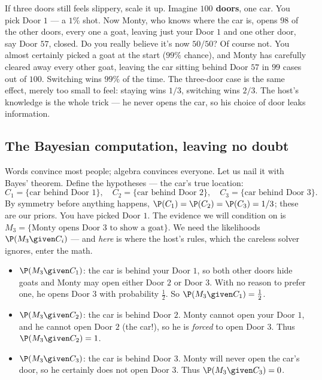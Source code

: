 \begin{intuitionbox}
If three doors still feels slippery, scale it up. Imagine \textbf{$100$ doors}, one car.
You pick Door $1$ --- a $1\%$ shot. Now Monty, who knows where the car is, opens
$98$ of the other doors, every one a goat, leaving just your Door $1$ and one other door,
say Door $57$, closed. Do you really believe it's now $50/50$? Of course not. You almost
certainly picked a goat at the start ($99\%$ chance), and Monty has carefully cleared away
every other goat, leaving the car sitting behind Door $57$ in $99$ cases out of $100$.
Switching wins $99\%$ of the time. The three-door case is the same effect, merely too
small to feel: staying wins $1/3$, switching wins $2/3$. The host's knowledge is the
whole trick --- he never opens the car, so his choice of door leaks information.
\end{intuitionbox}

\subsection{The Bayesian computation, leaving no doubt}

Words convince most people; algebra convinces everyone. Let us nail it with Bayes'
theorem. Define the hypotheses --- the car's true location:
\[
  C_1 = \{\text{car behind Door 1}\},\quad
  C_2 = \{\text{car behind Door 2}\},\quad
  C_3 = \{\text{car behind Door 3}\}.
\]
By symmetry before anything happens, $\P(C_1)=\P(C_2)=\P(C_3)=1/3$; these are our priors.
You have picked Door $1$. The evidence we will condition on is $M_3 = \{\text{Monty opens
Door 3 to show a goat}\}$. We need the likelihoods $\P(M_3 \given C_i)$ --- and \emph{here}
is where the host's rules, which the careless solver ignores, enter the math.

\begin{itemize}
\item $\P(M_3 \given C_1)$: the car is behind your Door $1$, so both other doors hide
goats and Monty may open either Door $2$ or Door $3$. With no reason to prefer one, he
opens Door $3$ with probability $\tfrac{1}{2}$. So $\P(M_3\given C_1)=\tfrac12$.
\item $\P(M_3 \given C_2)$: the car is behind Door $2$. Monty cannot open your Door $1$,
and he cannot open Door $2$ (the car!), so he is \emph{forced} to open Door $3$. Thus
$\P(M_3\given C_2)=1$.
\item $\P(M_3 \given C_3)$: the car is behind Door $3$. Monty will never open the car's
door, so he certainly does not open Door $3$. Thus $\P(M_3\given C_3)=0$.
\end{itemize}

